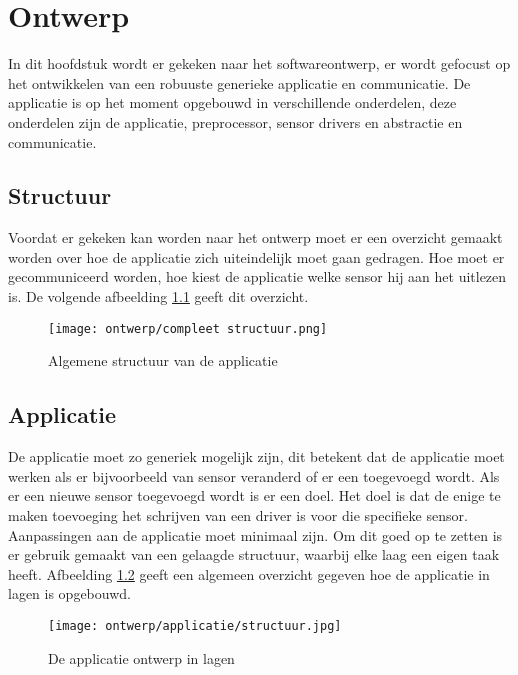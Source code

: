 \chapter{Ontwerp}
In dit hoofdstuk wordt er gekeken naar het softwareontwerp, er wordt gefocust op het ontwikkelen van een robuuste generieke applicatie en communicatie. De applicatie is op het moment opgebouwd in verschillende onderdelen, deze onderdelen zijn de applicatie, preprocessor, sensor drivers en abstractie en communicatie.

\section{Structuur}
Voordat er gekeken kan worden naar het ontwerp moet er een overzicht gemaakt worden over hoe de applicatie zich uiteindelijk moet gaan gedragen. Hoe moet er gecommuniceerd worden, hoe kiest de applicatie welke sensor hij aan het uitlezen is. De volgende afbeelding \ref{fig:appstructuur} geeft dit overzicht. 
\begin{figure}[h!]
	\centering
	\label{fig:appstructuur}
	\texttt{[image: ontwerp/compleet structuur.png]}
	\caption{Algemene structuur van de applicatie}
\end{figure}

\newpage
\section{Applicatie}
De applicatie moet zo generiek mogelijk zijn, dit betekent dat de applicatie moet werken als er bijvoorbeeld van sensor veranderd of er een toegevoegd wordt. Als er een nieuwe sensor toegevoegd wordt is er een doel. Het doel is dat de enige te maken toevoeging het schrijven van een driver is voor die specifieke sensor. Aanpassingen aan de applicatie moet minimaal zijn. Om dit goed op te zetten is er gebruik gemaakt van een gelaagde structuur, waarbij elke laag een eigen taak heeft. Afbeelding \ref{fig:appontwerp} geeft een algemeen overzicht gegeven hoe de applicatie in lagen is opgebouwd. 
\begin{figure}[h!]
	\centering
	\label{fig:appontwerp}

	\texttt{[image: ontwerp/applicatie/structuur.jpg]}
	\caption{De applicatie ontwerp in lagen}
\end{figure}

